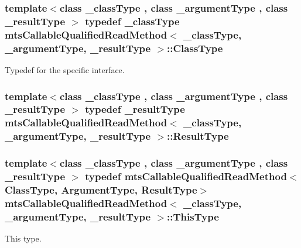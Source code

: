 \hypertarget{classmts_callable_qualified_read_method_a6cfee5c3c3c49c691c2f5176ea79d735}{
\subsubsection[{Class\-Type}]{\setlength{\rightskip}{0pt plus 5cm}template$<$class \-\_\-class\-Type , class \-\_\-argument\-Type , class \-\_\-result\-Type $>$ typedef \-\_\-class\-Type {\bf mts\-Callable\-Qualified\-Read\-Method}$<$ \-\_\-class\-Type, \-\_\-argument\-Type, \-\_\-result\-Type $>$\-::{\bf Class\-Type}}}\label{classmts_callable_qualified_read_method_a6cfee5c3c3c49c691c2f5176ea79d735}
Typedef for the specific interface. \hypertarget{classmts_callable_qualified_read_method_a728e57693d845188e5c248a6437f843e}{
\subsubsection[{Result\-Type}]{\setlength{\rightskip}{0pt plus 5cm}template$<$class \-\_\-class\-Type , class \-\_\-argument\-Type , class \-\_\-result\-Type $>$ typedef \-\_\-result\-Type {\bf mts\-Callable\-Qualified\-Read\-Method}$<$ \-\_\-class\-Type, \-\_\-argument\-Type, \-\_\-result\-Type $>$\-::{\bf Result\-Type}}}\label{classmts_callable_qualified_read_method_a728e57693d845188e5c248a6437f843e}
\hypertarget{classmts_callable_qualified_read_method_a4eae6a460f791fe12b4dcf83d83d429e}{
\subsubsection[{This\-Type}]{\setlength{\rightskip}{0pt plus 5cm}template$<$class \-\_\-class\-Type , class \-\_\-argument\-Type , class \-\_\-result\-Type $>$ typedef {\bf mts\-Callable\-Qualified\-Read\-Method}$<${\bf Class\-Type}, {\bf Argument\-Type}, {\bf Result\-Type}$>$ {\bf mts\-Callable\-Qualified\-Read\-Method}$<$ \-\_\-class\-Type, \-\_\-argument\-Type, \-\_\-result\-Type $>$\-::{\bf This\-Type}}}\label{classmts_callable_qualified_read_method_a4eae6a460f791fe12b4dcf83d83d429e}
This type. 

